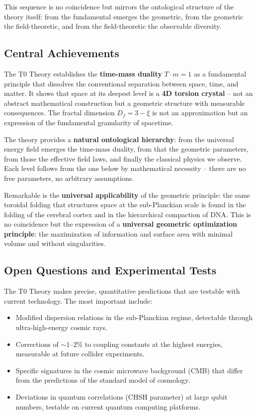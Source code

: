\documentclass[11pt,oneside]{book}
\begin{document}
This sequence is no coincidence but mirrors the ontological structure of the theory itself: from the fundamental emerges the geometric, from the geometric the field-theoretic, and from the field-theoretic the observable diversity.

\subsection*{Central Achievements}

The T0 Theory establishes the \textbf{time-mass duality} $T \cdot m = 1$ as a fundamental principle that dissolves the conventional separation between space, time, and matter. It shows that space at its deepest level is a \textbf{4D torsion crystal} -- not an abstract mathematical construction but a geometric structure with measurable consequences. The fractal dimension $D_f = 3 - \xi$ is not an approximation but an expression of the fundamental granularity of spacetime.

The theory provides a \textbf{natural ontological hierarchy}: from the universal energy field emerges the time-mass duality, from that the geometric parameters, from those the effective field laws, and finally the classical physics we observe. Each level follows from the one below by mathematical necessity -- there are no free parameters, no arbitrary assumptions.

Remarkable is the \textbf{universal applicability} of the geometric principle: the same toroidal folding that structures space at the sub-Planckian scale is found in the folding of the cerebral cortex and in the hierarchical compaction of DNA. This is no coincidence but the expression of a \textbf{universal geometric optimization principle}: the maximization of information and surface area with minimal volume and without singularities.

\subsection*{Open Questions and Experimental Tests}

The T0 Theory makes precise, quantitative predictions that are testable with current technology. The most important include:

\begin{itemize}[label=$\bullet$]
	\item Modified dispersion relations in the sub-Planckian regime, detectable through ultra-high-energy cosmic rays.
	\item Corrections of $\sim 1$--$2\%$ to coupling constants at the highest energies, measurable at future collider experiments.
	\item Specific signatures in the cosmic microwave background (CMB) that differ from the predictions of the standard model of cosmology.
	\item Deviations in quantum correlations (CHSH parameter) at large qubit numbers, testable on current quantum computing platforms.
\end{itemize}
\end{document}
